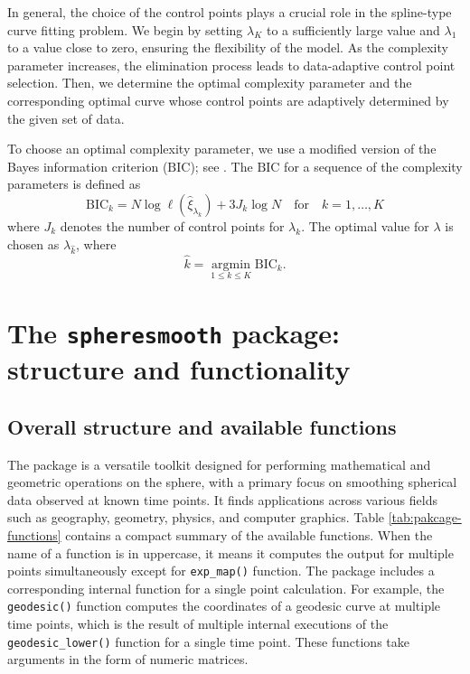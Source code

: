 In general, the choice of the control points plays a crucial role in the spline-type curve fitting problem. We begin by setting \(\lambda_K\) to a sufficiently large value and \(\lambda_1\) to a value close to zero, ensuring the flexibility of the model. As the complexity parameter increases, the elimination process leads to data-adaptive control point selection. Then, we determine the optimal complexity parameter and the corresponding optimal curve whose control points are adaptively determined by the given set of data.

To choose an optimal complexity parameter, we use a modified version of the Bayes information criterion (\(\text{BIC}\)); see \citet{schwarz1978}. The \(\text{BIC}\) for a sequence of the complexity parameters is defined as
\[
\text{BIC}_k = N \log \ell(\hat{\xi}_{\lambda_k}) +
3 J_k \log N \quad \text{for} \quad k = 1, \ldots, K
\]
where \(J_k\) denotes the number of control points for \(\lambda_k\).
The optimal value for \(\lambda\) is chosen as \(\lambda_{\hat{k}}\), where
\[
\hat{k} = \underset{1 \le k \le K}{\operatorname{argmin}}  \text{BIC}_k.
\]

\section{\texorpdfstring{The \texttt{spheresmooth} package: structure and functionality}{The spheresmooth package: structure and functionality}}\label{package}

\subsection*{Overall structure and available functions}\label{overall-structure-and-available-functions}

The  package is a versatile toolkit designed for performing mathematical and geometric operations on the sphere, with a primary focus on smoothing spherical data observed at known time points. It finds applications across various fields such as geography, geometry, physics, and computer graphics. Table \ref{tab:pakcage-functions} contains a compact summary of the available functions. When the name of a function is in uppercase, it means it computes the output for multiple points simultaneously except for \texttt{exp\_map()} function. The package includes a corresponding internal function for a single point calculation. For example, the \texttt{geodesic()} function computes the coordinates of a geodesic curve at multiple time points, which is the result of multiple internal executions of the \texttt{geodesic\_lower()} function for a single time point. These functions take arguments in the form of numeric matrices.

